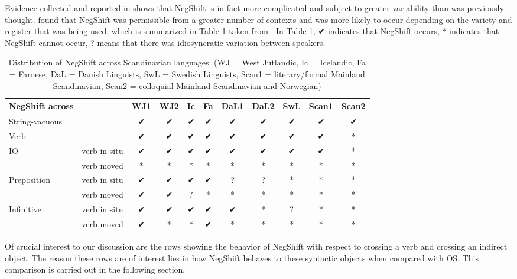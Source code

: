 \documentclass[12pt, letterpaper]{article}
\begin{document}
Evidence collected and reported in \citet{engelsMicrovariationObjectPositions2011,engelsScandinavianNegativeIndefinites2012} shows that NegShift is in fact more complicated and subject to greater variability than was previously thought. \citeauthor{engelsScandinavianNegativeIndefinites2012} found that NegShift was permissible from a greater number of contexts and was more likely to occur depending on the variety and register that was being used, which is summarized in Table \ref{tab:Distribution} taken from \citet{engelsScandinavianNegativeIndefinites2012}. In Table \ref{tab:Distribution}, ✔︎ indicates that NegShift occurs, * indicates that NegShift cannot occur, ? means that there was idiosyncratic variation between speakers.
\begin{table}[!ht]
	\centering
	\caption{Distribution of NegShift across Scandinavian languages. (WJ = West Jutlandic, Ic = Icelandic, Fa = Faroese, DaL = Danish Linguists, SwL = Swedish Linguists, Scan1 = literary/formal Mainland Scandinavian, Scan2 = colloquial Mainland Scandinavian and Norwegian)}
	\label{tab:Distribution}
\begin{tabular}{llccccccccc}
	\hline 
	NegShift across &  & WJ1 & WJ2 & Ic & Fa & DaL1 & DaL2 & SwL & Scan1 & Scan2 \\ 
	\hline 
	String-vacuous &  & ✔︎ & ✔︎ & ✔︎ & ✔︎ & ✔︎ & ✔︎ & ✔︎ & ✔︎ & ✔︎ \\ 
	Verb &  & ✔︎ & ✔︎ & ✔︎ & ✔︎ & ✔︎ & ✔︎ & ✔︎ & ✔︎ & * \\ 
	IO & verb in situ & ✔︎ & ✔︎ & ✔︎ & ✔︎ & ✔︎ & ✔︎ & ✔︎ & ✔︎ & * \\ 
	& verb moved & * & * & * & * & * & * & * & * & * \\ 
	Preposition & verb in situ & ✔︎ & ✔︎ & ✔︎ & ✔︎ & ? & ? & * & * & * \\ 
	& verb moved & ✔︎ & ✔︎ & ? & * & * & * & * & * & * \\ 
	Infinitive & verb in situ & ✔︎ & ✔︎ & ✔︎ & ✔︎ & ✔︎ & * & ? & * & * \\ 
	& verb moved & ✔︎ & * & * & ✔︎ & * & * & * & * & * \\ 
	\hline 
\end{tabular} 
\end{table}


Of crucial interest to our discussion are the rows showing the behavior of NegShift with respect to crossing a verb and crossing an indirect object.  The reason these rows are of interest lies in how NegShift behaves to these syntactic objects when compared with OS. This comparison is carried out in the following section.
\end{document}
